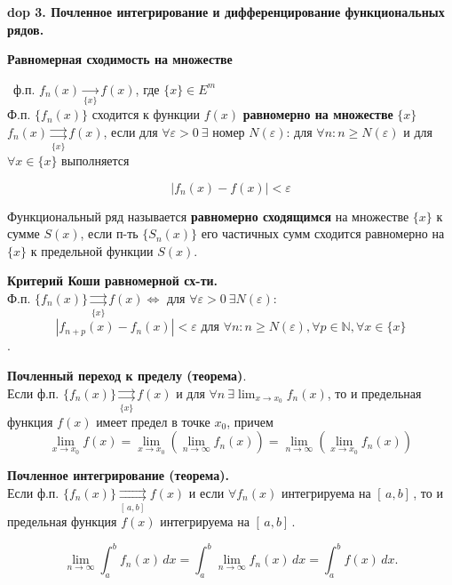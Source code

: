 \textbf{\LARGE dop 3. Почленное интегрирование и дифференцирование функциональных рядов.}

\textbf{Равномерная сходимость на множестве}

\mathLet \ ф.п. $f_n(x) \xrightarrow[\{x\}]{}  f(x)$, где $\{x\} \in E^m$ \\
Ф.п. $\{f_n(x)\}$ сходится к функции $f(x)$ \textbf{равномерно на множестве} $\{x\}$ \ $f_n(x)\underset{\{x\}}{\rightrightarrows}f(x)$, если для $\forall \varepsilon > 0 \ \exists$ номер $N(\varepsilon)$: для $\forall n: n \ge N(\varepsilon)$ и для $\forall x \in \{x\}$ выполняется

\begin{equation}
    |f_n(x) - f(x)| < \varepsilon
\end{equation}

\bigbreak
Функциональный ряд называется \textbf{равномерно сходящимся} на множестве $\{x\}$ к сумме $S(x)$, если п-ть $\{S_n(x)\}$ его частичных сумм сходится равномерно на $\{x\}$ к предельной функции $S(x)$.

\bigbreak
\textbf{Критерий Коши равномерной сх-ти.} \\
Ф.п. $\{f_n(x)\}\underset{\{x\}}{\rightrightarrows}f(x) \Leftrightarrow $ для $\forall \varepsilon > 0 \ \exists N(\varepsilon): $
$$
    |f_{n+p}(x) - f_n(x)| < \varepsilon \text{ для } \forall n: n \ge N(\varepsilon), \forall p \in \mathbb{N}, \forall x \in \{x\}
$$.

\bigbreak
\textbf{Почленный переход к пределу (теорема)}. \\
Если ф.п. $\{f_n(x)\} \underset{\{x\}}{\rightrightarrows}f(x)$ и для $\forall n \ \exists \lim_{x \rightarrow x_0}{f_n(x)} $, то и предельная функция $f(x)$ имеет предел в точке $x_0$, причем
\begin{equation}
    \lim_{x \rightarrow x_0}{f(x)} = \lim_{x \rightarrow x_0}{(\lim_{n \rightarrow \infty}{f_n(x)})} = \lim_{n \rightarrow \infty}{(\lim_{x \rightarrow x_0}{f_n(x)})}
\end{equation}


\bigbreak
\textbf{Почленное интегрирование (теорема).} \\
Если ф.п. $\{f_n(x)\} \underset{[\,a,b]\, }{\rightrightarrows}f(x)$ и если $\forall f_n(x)$ интегрируема на $[\,a,b]\,$, то и предельная функция $f(x)$ интегрируема на $[\,a,b]\,$.

\begin{equation}
    \lim_{n \rightarrow \infty}{\int_{a}^{b} f_n(x) \,dx} =  \int_{a}^{b} \lim_{n \rightarrow \infty}{f_n(x)} \,dx = \int_{a}^{b} f(x) \,dx.
\end{equation}

